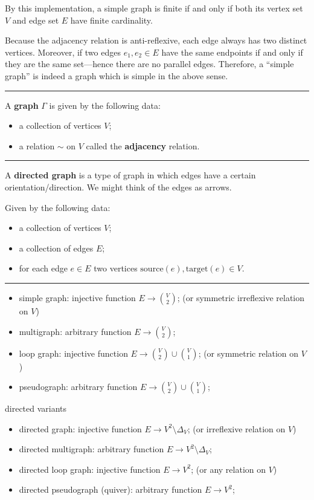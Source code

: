 \documentclass[12pt]{article}
\newcommand{\keyword}[1]{\textbf{#1}}
\newcommand{\sepline}{\rule{\textwidth}{0.4pt}}
\theoremstyle{definition}
\newcommand{\<}{\left\langle}
\renewcommand{\>}{\right\rangle}
\newcommand{\source}{\mathrm{source}}
\newcommand{\target}{\mathrm{target}}
\begin{document}
By this implementation, a simple graph is finite if and only if both its vertex set $V$ and edge set $E$ have finite cardinality.

Because the adjacency relation is anti-reflexive, each edge always has two distinct vertices.
Moreover, if two edges $e_1, e_2 \in E$ have the same endpoints if and only if they are the same set---hence there are no parallel edges.
Therefore, a ``simple graph'' is indeed a graph which is simple in the above sense.



\sepline

A \keyword{graph} $\Gamma$ is given by the following data:
\begin{itemize}
    \item a collection of vertices $V$;
    \item a relation $\sim$ on $V$ called the \keyword{adjacency} relation.
\end{itemize}

\sepline

A \keyword{directed graph} is a type of graph in which edges have a certain orientation/direction.
We might think of the edges as arrows.

Given by the following data:
\begin{itemize}
    \item a collection of vertices $V$;
    \item a collection of edges $E$;
    \item for each edge $e \in E$ two vertices $\source(e), \target(e) \in V$.
\end{itemize}

\sepline



\begin{itemize}
    \item simple graph: injective function $E \to \binom{V}{2}$; 
    (or symmetric irreflexive relation on $V$)
    \item multigraph: arbitrary function $E \to \binom{V}{2}$;
    \item loop graph: injective function $E \to \binom{V}{2} \cup \binom{V}{1}$;
    (or symmetric relation on $V$)
    \item pseudograph: arbitrary function $E \to \binom{V}{2} \cup \binom{V}{1}$;
\end{itemize}


directed variants
\begin{itemize}
    \item directed graph: injective function $E \to V^2 \setminus \Delta_V$;
    (or irreflexive relation on $V$)
    \item directed multigraph: arbitrary function $E \to V^2 \setminus \Delta_V$;
    \item directed loop graph: injective function $E \to V^2$;
    (or any relation on $V$)
    \item directed pseudograph (quiver): arbitrary function $E \to V^2$;
\end{itemize}
\end{document}
